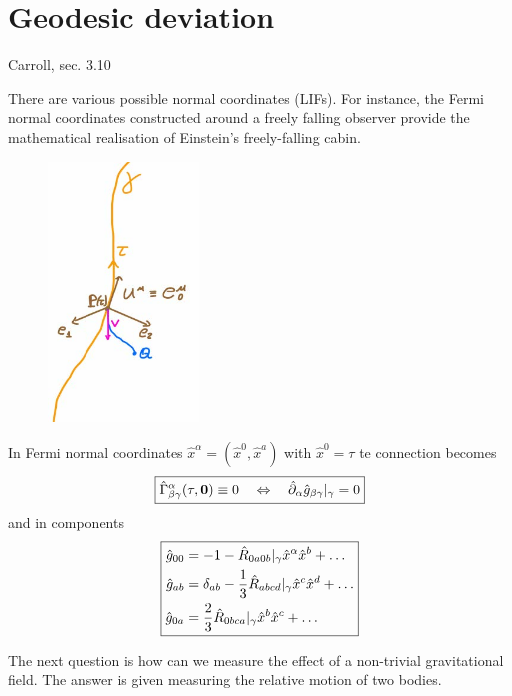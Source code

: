 \documentclass[../main/main.tex]{subfiles}
\begin{document}
\section{Geodesic deviation}
\textsf{Carroll, sec. 3.10}

There are various possible normal coordinates (LIFs). For instance, the Fermi normal coordinates constructed around a freely falling observer provide the mathematical realisation of Einstein's freely-falling cabin. 
%
\begin{figure}[H]
\centering
\includegraphics[width=4cm]{../img/Fermi-normal-coord-free.jpg}
\end{figure}
\noindent
In Fermi normal coordinates $\hat x^\alpha=(\hat x^0,\hat x^a)$ with $\hat x^0=\tau$ te connection becomes
\begin{equation}\boxed{
\hchris\alpha\beta\gamma(\tau,\vect 0)\equiv0\quad\Leftrightarrow\quad\hpde\alpha\hmet\beta\gamma\vert_\gamma=0
}\end{equation}
and in components
\begin{equation}\boxed{\begin{split}
\hat g_{0 0}&=-1-{\hat R}_{0 a 0 b}\vert_\gamma\hat x^\alpha\hat x^b+\dots\\
\hat g_{a b}&=\delta_{ab}-\frac13{\hat R}_{a b c d}\vert_\gamma\hat x^c\hat x^d+\dots\\
\hat g_{0 a}&=\frac23{\hat R}_{0 b c a}\vert_\gamma\hat x^b\hat x^c+\dots
\end{split}}\end{equation}

The next question is how can we measure the effect of a non-trivial gravitational field. The answer is given measuring the relative motion of two bodies. 
\end{document}
